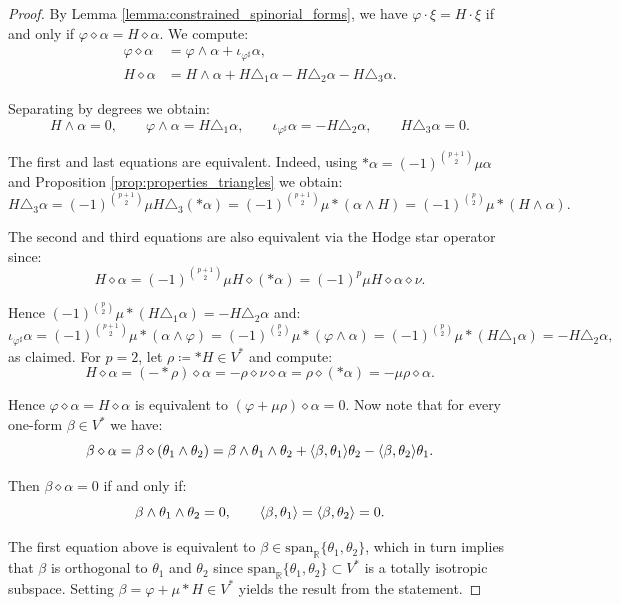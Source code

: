 \documentclass[10pt,reqno]{amsart}
\theoremstyle{definition}
\theoremstyle{remark}
\newcommand{\R}{\mathbb{R}}
\DeclarePairedDelimiter{\escal}{\langle}{\rangle}
\begin{document}
\begin{proof}
    By Lemma \ref{lemma:constrained_spinorial_forms}, we have $\varphi\cdot\xi=H\cdot\xi$ if and only if $\varphi\diamond\alpha=H\diamond\alpha$. We compute: \begin{align*}
        \varphi\diamond\alpha&=\varphi\wedge\alpha+\iota_{\varphi^\sharp}\alpha,\\
        H\diamond\alpha&=H\wedge\alpha+H\triangle_1\alpha-H\triangle_2\alpha-H\triangle_3\alpha.
    \end{align*}
    
    Separating by degrees we obtain: $$H\wedge\alpha=0,\qquad \varphi\wedge\alpha=H\triangle_1\alpha,\qquad \iota_{\varphi^\sharp}\alpha=-H\triangle_2\alpha,\qquad H\triangle_3\alpha=0.$$
    
    The first and last equations are equivalent. Indeed, using $*\alpha=(-1)^{\binom{p+1}{2}}\mu\alpha$ and Proposition \ref{prop:properties_triangles} we obtain: $$H\triangle_3\alpha=(-1)^{\binom{p+1}{2}}\mu H\triangle_3(*\alpha)=(-1)^{\binom{p+1}{2}}\mu*(\alpha\wedge H)=(-1)^{\binom{p}{2}}\mu*(H\wedge\alpha).$$
    
    The second and third equations are also equivalent via the Hodge star operator since: $$H\diamond\alpha=(-1)^{\binom{p+1}{2}}\mu H\diamond(*\alpha)=(-1)^p\mu H\diamond\alpha\diamond\nu.$$
    
    Hence $(-1)^{\binom{p}{2}}\mu*(H\triangle_1\alpha)=-H\triangle_2\alpha$ and: $$\iota_{\varphi^\sharp}\alpha=(-1)^{\binom{p+1}{2}}\mu*(\alpha\wedge\varphi)=(-1)^{\binom{p}{2}}\mu*(\varphi\wedge\alpha)=(-1)^{\binom{p}{2}}\mu*(H\triangle_1\alpha)=-H\triangle_2\alpha,$$ as claimed. For $p=2$, let $\rho\coloneqq*H\in V^*$ and compute: $$H\diamond\alpha=(-*\rho)\diamond\alpha=-\rho\diamond\nu\diamond\alpha=\rho\diamond(*\alpha)=-\mu\rho\diamond\alpha.$$
    
    Hence $\varphi\diamond\alpha=H\diamond\alpha$ is equivalent to $(\varphi+\mu\rho)\diamond\alpha=0$. Now note that for every one-form $\beta\in V^*$ we have: $$\beta\diamond\alpha=\beta\diamond(\theta_1\wedge\theta_2)=\beta\wedge\theta_1\wedge\theta_2+\escal{\beta,\theta_1}\theta_2-\escal{\beta,\theta_2}\theta_1.$$
    
    Then $\beta\diamond\alpha=0$ if and only if: $$\beta\wedge\theta_1\wedge\theta_2=0,\qquad \escal{\beta,\theta_1}=\escal{\beta,\theta_2}=0.$$
    
    The first equation above is equivalent to $\beta\in\mathrm{span}_\R\{\theta_1,\theta_2\}$, which in turn implies that $\beta$ is orthogonal to $\theta_1$ and $\theta_2$ since $\mathrm{span}_\R\{\theta_1,\theta_2\}\subset V^*$ is a totally isotropic subspace. Setting $\beta=\varphi+\mu*H\in V^*$ yields the result from the statement.
\end{proof}
\end{document}
